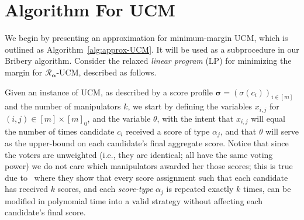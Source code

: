 \documentclass[letterpaper]{article} %
\theoremstyle{definition}
\newcommand\vecgreek{\bm}
\newcommand{\veca}{\vecgreek{\alpha}}
\newcommand{\vecs}{\vecgreek{\sigma}}
\newcommand{\Ra}{\mathcal{R}_{\veca}}
\begin{document}
\section{Algorithm For UCM}
We begin by presenting an approximation for minimum-margin UCM, which is outlined as Algorithm~\ref{alg:approx-UCM}. It will be used as a subprocedure in our Bribery algorithm.
Consider the relaxed \emph{linear program} (LP) for minimizing the margin for $\Ra$-UCM, described as follows.

Given an instance of UCM, as described  by a score profile $\vecs=(\sigma(c_i))_{i \in [m]}$ and the number of manipulators $k$,
we start by defining the variables $x_{i,j}$ for $(i,j) \in [m]\times[m]_0$, and the variable $\theta$, with the intent that $x_{i,j}$ will equal the number of times candidate $c_i$ received a score of type $\alpha_j$, and that $\theta$ will serve as the upper-bound on each candidate's final aggregate score. Notice that since the voters are unweighted (i.e., they are identical; all have the same voting power) we do not care which manipulators awarded her those scores; this is true due to~\cite[Theorem~7]{DBLP:journals/ai/DaviesKNWX14} where they show that every score assignment such that each candidate has received $k$ scores, and each \emph{score-type} $\alpha_j$  is repeated exactly $k$ times, can be modified in polynomial time
into a valid strategy without affecting each candidate's final score.
\end{document}
